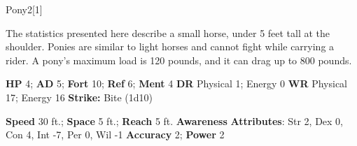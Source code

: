   \begin{monsection}{Pony}{2}[1]
    \vspace{-1em}\vspace{-1em}
    \vspace{0em}

    
      The statistics presented here describe a small horse, under 5 feet tall at the shoulder.
      Ponies are similar to light horses and cannot fight while carrying a rider.
      A pony's maximum load is 120 pounds, and it can drag up to 800 pounds.
    

    \begin{spellcontent}
      \begin{spelltargetinginfo}
        \pari \textbf{HP} 4;
          \textbf{AD} 5;
          \textbf{Fort} 10;
          \textbf{Ref} 6;
          \textbf{Ment} 4
        \pari \textbf{DR} Physical 1; Energy 0
        \pari \textbf{WR} Physical 17; Energy 16
        \pari \textbf{Strike:}
            Bite  (1d10)
      \end{spelltargetinginfo}
    \end{spellcontent}
    \begin{monsterfooter}
      \pari \textbf{Speed} 30 ft.;
        \textbf{Space} 5 ft.;
        \textbf{Reach} 5 ft.
      \pari \textbf{Awareness} 
      \pari \textbf{Attributes}:
        Str 2, Dex 0,
        Con 4, Int -7,
        Per 0, Wil -1
      \pari \textbf{Accuracy} 2;
        \textbf{Power} 2
    \end{monsterfooter}
  \end{monsection}
  
